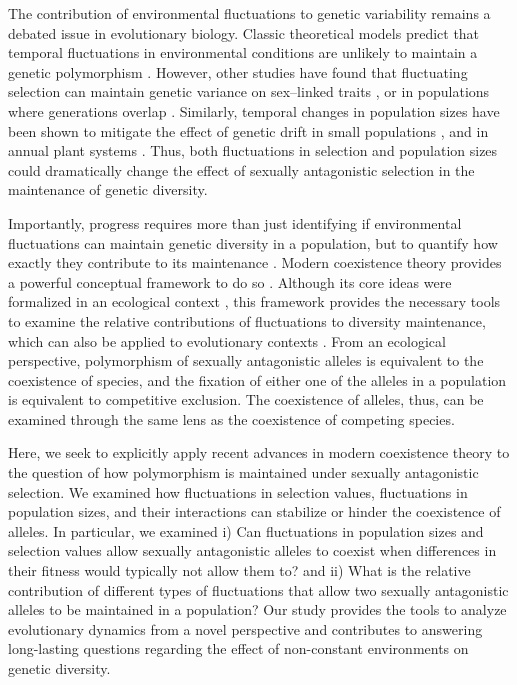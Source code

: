 The contribution of environmental fluctuations to genetic variability remains a debated issue in evolutionary biology. Classic theoretical models predict that temporal fluctuations in environmental conditions are unlikely to maintain a genetic polymorphism \citep{hedrick1974genetic,hedrick1986genetic}. However, other studies have found that fluctuating selection can maintain genetic variance on sex--linked traits \citep{reinhold2000maintenance}, or in populations where generations overlap \citep{ellner1994role, ellner1996patterns}. Similarly, temporal changes in population sizes have been shown to mitigate the effect of genetic drift in small populations \citep{pemberton1996maintenance}, and in annual plant systems \citep{nunney2002effective}. Thus, both fluctuations in selection and population sizes could dramatically change the effect of sexually antagonistic selection in the maintenance of genetic diversity.


Importantly, progress requires more than just identifying if environmental fluctuations can maintain genetic diversity in a population, but to quantify how exactly they contribute to its maintenance \citep{ellner2016quantify}. Modern coexistence theory provides a powerful conceptual framework to do so \citep{Chesson2000,chesson1994multispecies, barabas_chessons_2018}. Although its core ideas were formalized in an ecological context \citep{chesson1994multispecies,Chesson2000}, this framework provides the necessary tools to examine the relative contributions of fluctuations to diversity maintenance, which can also be applied to evolutionary contexts  \citep{ellner1996patterns,reinhold2000maintenance,schreiber2020factors}. From an ecological perspective, polymorphism of sexually antagonistic alleles is equivalent to the coexistence of species, and the fixation of either one of the alleles in a population is equivalent to competitive exclusion. The coexistence of alleles, thus, can be examined through the same lens as the coexistence of competing species.

Here, we seek to explicitly apply recent  advances in modern coexistence theory to the question of how
polymorphism is maintained under sexually antagonistic selection.  We examined how fluctuations in selection values, fluctuations in population sizes, and their interactions can stabilize or hinder the coexistence of alleles. In particular, we examined  i) Can fluctuations in population sizes and selection values allow sexually antagonistic alleles to coexist when differences in their fitness would typically not allow them to? and ii) What is the relative contribution of different types of fluctuations that allow two sexually antagonistic alleles to be maintained in a population? Our study provides the tools to analyze evolutionary dynamics from a novel perspective and contributes to answering long-lasting questions regarding the effect of non-constant environments on genetic diversity.



